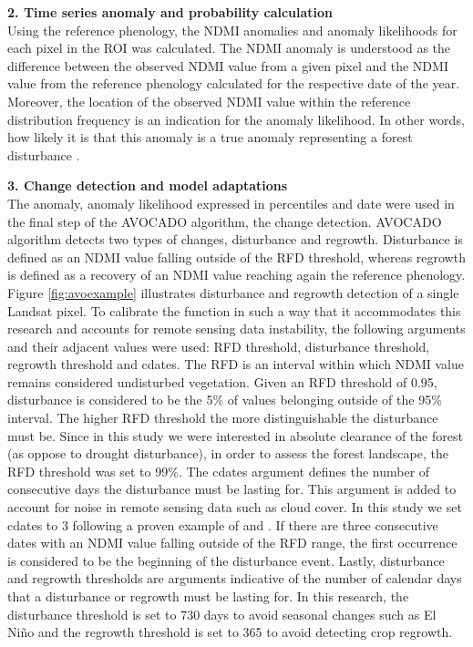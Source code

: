 \textbf{2. Time series anomaly and probability calculation}\\
Using the reference phenology, the \ac{NDMI} anomalies and anomaly likelihoods for each pixel in the \ac{ROI} was calculated. The \ac{NDMI} anomaly is understood as the difference between the observed \ac{NDMI} value from a given pixel and the \ac{NDMI} value from the reference phenology calculated for the respective date of the year. Moreover, the location of the observed \ac{NDMI} value within the reference distribution frequency is an indication for the anomaly likelihood. In other words, how likely it is that this anomaly is a true anomaly representing a forest disturbance \citep{decuyperContinuousMonitoringForest2022}. 

\textbf{3. Change detection and model adaptations}\\
The anomaly, anomaly likelihood expressed in percentiles and date were used in the final step of the \ac{AVOCADO} algorithm, the change detection. \ac{AVOCADO} algorithm detects two types of changes, disturbance and regrowth. Disturbance is defined as an \ac{NDMI} value falling outside of the \ac{RFD} threshold, whereas regrowth is defined as a recovery of an \ac{NDMI} value reaching again the reference phenology. %
Figure \ref{fig:avoexample} illustrates disturbance and regrowth detection of a single Landsat pixel. To calibrate the function in such a way that it accommodates this research and accounts for remote sensing data instability, the following arguments and their adjacent values were used: \ac{RFD} threshold, disturbance threshold, regrowth threshold and \ac{cdates}. The \ac{RFD} is an interval within which \ac{NDMI} value remains considered undisturbed vegetation. Given an \ac{RFD} threshold of 0.95, disturbance is considered to be the 5\% of values belonging outside of the 95\% interval. The higher \ac{RFD} threshold the more distinguishable the disturbance must be. Since in this study we were interested in absolute clearance of the forest (as oppose to drought disturbance), in order to assess the forest landscape, the \ac{RFD} threshold was set to 99\%. The \ac{cdates} argument defines the number of consecutive days the disturbance must be lasting for. This argument is added to account for noise in remote sensing data such as cloud cover. In this study we set \ac{cdates} to 3 following a proven example of \citet{decuyperContinuousMonitoringForest2022} and \citet{ ZHU201275}. If there are three consecutive dates with an \ac{NDMI} value falling outside of the \ac{RFD} range, the first occurrence is considered to be the beginning of the disturbance event. Lastly, disturbance and regrowth thresholds are arguments indicative of the number of calendar days that a disturbance or regrowth must be lasting for. In this research, the disturbance threshold is set to 730 days to avoid seasonal changes such as El Ni\~{n}o and the regrowth threshold is set to 365 to avoid detecting crop regrowth. 
    
